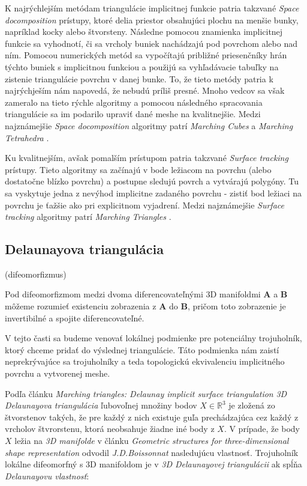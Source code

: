 K najrýchlejším metódam triangulácie implicitnej funkcie patria takzvané \textit{Space docomposition}
prístupy, ktoré delia priestor obsahujúci plochu na menšie bunky, napríklad kocky alebo štvorsteny.
Následne pomocou znamienka implicitnej funkcie sa vyhodnotí, či sa vrcholy buniek nachádzajú pod povrchom 
alebo nad ním. Pomocou numerických metód sa vypočítajú približné priesenčníky hrán týchto buniek s 
implicitnou funkciou a použijú sa vyhľadávacie tabuľky na zistenie triangulácie povrchu v danej bunke. 
To, že tieto metódy patria k najrýchješím nám napovedá, že nebudú príliš presné. Mnoho vedcov sa
však zameralo na tieto rýchle algoritmy a pomocou následného spracovania triangulácie sa im 
podarilo upraviť dané meshe na kvalitnejšie. Medzi najznámejšie \textit{Space docomposition} algoritmy
patrí \textit{Marching Cubes} \cite{lorensen1987marching} a \textit{Marching Tetrahedra} \cite{doi1991efficient}.

Ku kvalitnejším, avšak pomalším prístupom patria takzvané \textit{Surface tracking} prístupy.
Tieto algoritmy sa začínajú v bode ležiacom na povrchu (alebo dostatočne blízko povrchu) a 
postupne sledujú povrch a vytvárajú polygóny. Tu sa vyskytuje jedna z nevýhod implicitne zadaného
povrchu - zistiť bod ležiaci na povrchu je ťažšie ako pri explicitnom vyjadrení. Medzi najznámejšie 
\textit{Surface tracking} algoritmy patrí \textit{Marching Triangles} \cite{hilton1996marching}.



\subsection{Delaunayova triangulácia}

\begin{note}
    (difeomorfizmus)

    Pod difeomorfizmom medzi dvoma diferencovateľnými 3D manifoldmi $\mathbf{A}$ a $\mathbf{B}$ 
    môžeme rozumieť existenciu zobrazenia z $\mathbf{A}$ do $\mathbf{B}$, pričom toto zobrazenie 
    je invertibilné a spojite diferencovateľné. 
\end{note}

V tejto časti sa budeme venovať lokálnej podmienke pre potenciálny trojuholník, ktorý chceme pridať do 
výslednej triangulácie. Táto podmienka nám zaistí neprekrývajúce sa trojuholníky a teda topologickú 
ekvivalenciu implicitného povrchu a vytvorenej meshe.

Podľa článku \textit{Marching triangles: Delaunay implicit surface triangulation} \cite{hilton1997marching} 
\textit{3D Delaunayova triangulácia} ľubovoľnej množiny bodov $X\in \mathbb{R}^3$ je 
zložená zo štvorstenov takých, že pre každý z nich existuje guľa prechádzajúca cez každý z vrcholov 
štvrorstenu, ktorá neobsahuje žiadne iné body z $X$. V prípade, že body $X$ ležia na \textit{3D manifolde} 
v článku \textit{Geometric structures for three-dimensional shape representation} 
\cite{boissonnat1984geometric} odvodil \textit{J.D.Boissonnat} nasledujúcu vlastnosť. Trojuholník
lokálne difeomorfný s 3D manifoldom je v \textit{3D Delaunayovej triangulácii} ak spĺňa 
\textit{Delaunayovu vlastnosť}:

